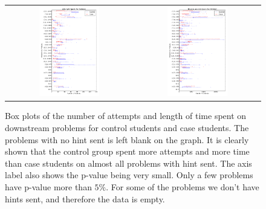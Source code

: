 \documentclass{llncs2e/llncs}
\begin{document}
\begin{figure}[ht]
  \centering
  \begin{tabular}{c c}
  \includegraphics[width=0.5\textwidth]{image/problem_tries_downstream.png} & 
  \includegraphics[width=0.5\textwidth]{image/problem_time_downstream.png}
  \end{tabular}
  \caption{Box plots of the number of attempts and length of time spent on downstream problems for control students and case students. The problems with no hint sent is left blank on the graph. It is clearly shown that the control group spent more attempts and more time than case students on almost all problems with hint sent. The axis label also shows the p-value being very small. Only a few problems have p-value more than $5\%$. For some of the problems we don't have hints sent, and therefore the data is empty.}
   \label{fig:prob_tries_analysis}
\end{figure}
\end{document}
